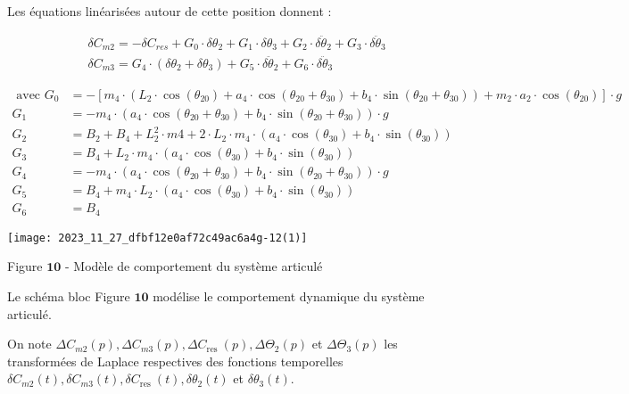 Les équations linéarisées autour de cette position donnent :

$$
\begin{aligned}
& \delta C_{m 2}=-\delta C_{r e s}+G_{0} \cdot \delta \theta_{2}+G_{1} \cdot \delta \theta_{3}+G_{2} \cdot \delta \ddot{\theta}_{2}+G_{3} \cdot \delta \ddot{\theta}_{3} \\
& \delta C_{m 3}=G_{4} \cdot\left(\delta \theta_{2}+\delta \theta_{3}\right)+G_{5} \cdot \delta \ddot{\theta}_{2}+G_{6} \cdot \delta \ddot{\theta}_{3}
\end{aligned}
$$

$$
\begin{aligned}
\text { avec } G_{0} & =-\left[m_{4} \cdot\left(L_{2} \cdot \cos \left(\theta_{20}\right)+a_{4} \cdot \cos \left(\theta_{20}+\theta_{30}\right)+b_{4} \cdot \sin \left(\theta_{20}+\theta_{30}\right)\right)+m_{2} \cdot a_{2} \cdot \cos \left(\theta_{20}\right)\right] \cdot g \\
G_{1} & =-m_{4} \cdot\left(a_{4} \cdot \cos \left(\theta_{20}+\theta_{30}\right)+b_{4} \cdot \sin \left(\theta_{20}+\theta_{30}\right)\right) \cdot g \\
G_{2} & =B_{2}+B_{4}+L_{2}^{2} \cdot m 4+2 \cdot L_{2} \cdot m_{4} \cdot\left(a_{4} \cdot \cos \left(\theta_{30}\right)+b_{4} \cdot \sin \left(\theta_{30}\right)\right) \\
G_{3} & =B_{4}+L_{2} \cdot m_{4} \cdot\left(a_{4} \cdot \cos \left(\theta_{30}\right)+b_{4} \cdot \sin \left(\theta_{30}\right)\right) \\
G_{4} & =-m_{4} \cdot\left(a_{4} \cdot \cos \left(\theta_{20}+\theta_{30}\right)+b_{4} \cdot \sin \left(\theta_{20}+\theta_{30}\right)\right) \cdot g \\
G_{5} & =B_{4}+m_{4} \cdot L_{2} \cdot\left(a_{4} \cdot \cos \left(\theta_{30}\right)+b_{4} \cdot \sin \left(\theta_{30}\right)\right) \\
G_{6} & =B_{4}
\end{aligned}
$$

\begin{center}
\texttt{[image: 2023\_11\_27\_dfbf12e0af72c49ac6a4g-12(1)]}
\end{center}

Figure $\mathbf{1 0}$ - Modèle de comportement du système articulé

Le schéma bloc Figure $\mathbf{1 0}$ modélise le comportement dynamique du système articulé.

On note $\Delta C_{m 2}(p), \Delta C_{m 3}(p), \Delta C_{\text {res }}(p), \Delta \Theta_{2}(p)$ et $\Delta \Theta_{3}(p)$ les transformées de Laplace respectives des fonctions temporelles $\delta C_{m 2}(t), \delta C_{m 3}(t), \delta C_{\text {res }}(t), \delta \theta_{2}(t)$ et $\delta \theta_{3}(t)$.

